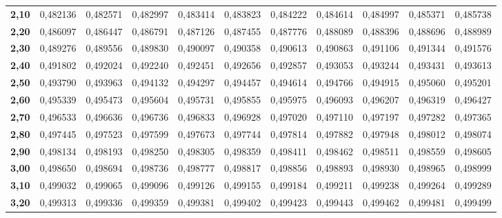 \begin{tabular}{|r||rrrrr|rrrrr|}
{\bf 2,10} &   0,482136 &   0,482571 &   0,482997 &   0,483414 &   0,483823 &   0,484222 &   0,484614 &   0,484997 &   0,485371 &   0,485738 \\

{\bf 2,20} &   0,486097 &   0,486447 &   0,486791 &   0,487126 &   0,487455 &   0,487776 &   0,488089 &   0,488396 &   0,488696 &   0,488989 \\

{\bf 2,30} &   0,489276 &   0,489556 &   0,489830 &   0,490097 &   0,490358 &   0,490613 &   0,490863 &   0,491106 &   0,491344 &   0,491576 \\

{\bf 2,40} &   0,491802 &   0,492024 &   0,492240 &   0,492451 &   0,492656 &   0,492857 &   0,493053 &   0,493244 &   0,493431 &   0,493613 \\
\hline
{\bf 2,50} &   0,493790 &   0,493963 &   0,494132 &   0,494297 &   0,494457 &   0,494614 &   0,494766 &   0,494915 &   0,495060 &   0,495201 \\

{\bf 2,60} &   0,495339 &   0,495473 &   0,495604 &   0,495731 &   0,495855 &   0,495975 &   0,496093 &   0,496207 &   0,496319 &   0,496427 \\

{\bf 2,70} &   0,496533 &   0,496636 &   0,496736 &   0,496833 &   0,496928 &   0,497020 &   0,497110 &   0,497197 &   0,497282 &   0,497365 \\

{\bf 2,80} &   0,497445 &   0,497523 &   0,497599 &   0,497673 &   0,497744 &   0,497814 &   0,497882 &   0,497948 &   0,498012 &   0,498074 \\

{\bf 2,90} &   0,498134 &   0,498193 &   0,498250 &   0,498305 &   0,498359 &   0,498411 &   0,498462 &   0,498511 &   0,498559 &   0,498605 \\
\hline \hline
{\bf 3,00} &   0,498650 &   0,498694 &   0,498736 &   0,498777 &   0,498817 &   0,498856 &   0,498893 &   0,498930 &   0,498965 &   0,498999 \\

{\bf 3,10} &   0,499032 &   0,499065 &   0,499096 &   0,499126 &   0,499155 &   0,499184 &   0,499211 &   0,499238 &   0,499264 &   0,499289 \\

{\bf 3,20} &   0,499313 &   0,499336 &   0,499359 &   0,499381 &   0,499402 &   0,499423 &   0,499443 &   0,499462 &   0,499481 &   0,499499 \\


\end{tabular}
